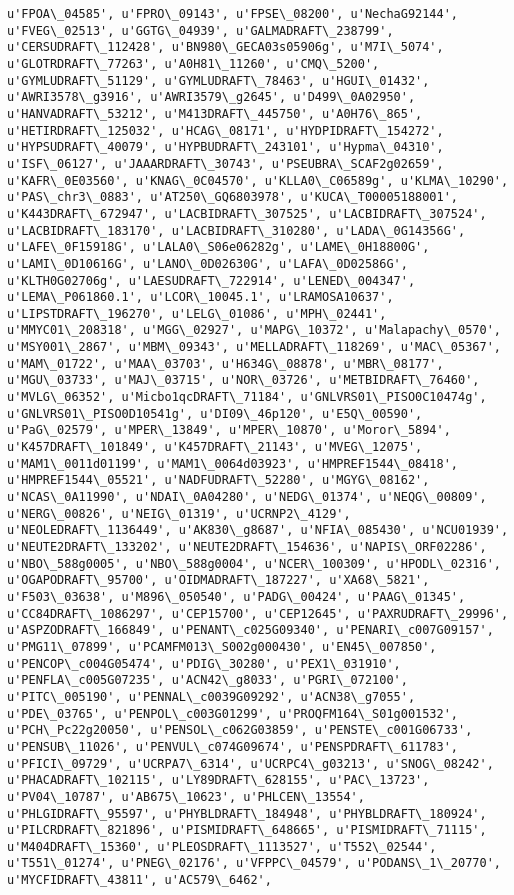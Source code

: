 \documentclass[11pt]{article}
\begin{document}
\begin{Verbatim}[commandchars=\\\{\}]
u'FPOA\_04585', u'FPRO\_09143', u'FPSE\_08200', u'NechaG92144', u'FVEG\_02513', u'GGTG\_04939', u'GALMADRAFT\_238799', u'CERSUDRAFT\_112428', u'BN980\_GECA03s05906g', u'M7I\_5074', u'GLOTRDRAFT\_77263', u'A0H81\_11260', u'CMQ\_5200', u'GYMLUDRAFT\_51129', u'GYMLUDRAFT\_78463', u'HGUI\_01432', u'AWRI3578\_g3916', u'AWRI3579\_g2645', u'D499\_0A02950', u'HANVADRAFT\_53212', u'M413DRAFT\_445750', u'A0H76\_865', u'HETIRDRAFT\_125032', u'HCAG\_08171', u'HYDPIDRAFT\_154272', u'HYPSUDRAFT\_40079', u'HYPBUDRAFT\_243101', u'Hypma\_04310', u'ISF\_06127', u'JAAARDRAFT\_30743', u'PSEUBRA\_SCAF2g02659', u'KAFR\_0E03560', u'KNAG\_0C04570', u'KLLA0\_C06589g', u'KLMA\_10290', u'PAS\_chr3\_0883', u'AT250\_GQ6803978', u'KUCA\_T00005188001', u'K443DRAFT\_672947', u'LACBIDRAFT\_307525', u'LACBIDRAFT\_307524', u'LACBIDRAFT\_183170', u'LACBIDRAFT\_310280', u'LADA\_0G14356G', u'LAFE\_0F15918G', u'LALA0\_S06e06282g', u'LAME\_0H18800G', u'LAMI\_0D10616G', u'LANO\_0D02630G', u'LAFA\_0D02586G', u'KLTH0G02706g', u'LAESUDRAFT\_722914', u'LENED\_004347', u'LEMA\_P061860.1', u'LCOR\_10045.1', u'LRAMOSA10637', u'LIPSTDRAFT\_196270', u'LELG\_01086', u'MPH\_02441', u'MMYC01\_208318', u'MGG\_02927', u'MAPG\_10372', u'Malapachy\_0570', u'MSY001\_2867', u'MBM\_09343', u'MELLADRAFT\_118269', u'MAC\_05367', u'MAM\_01722', u'MAA\_03703', u'H634G\_08878', u'MBR\_08177', u'MGU\_03733', u'MAJ\_03715', u'NOR\_03726', u'METBIDRAFT\_76460', u'MVLG\_06352', u'Micbo1qcDRAFT\_71184', u'GNLVRS01\_PISO0C10474g', u'GNLVRS01\_PISO0D10541g', u'DI09\_46p120', u'E5Q\_00590', u'PaG\_02579', u'MPER\_13849', u'MPER\_10870', u'Moror\_5894', u'K457DRAFT\_101849', u'K457DRAFT\_21143', u'MVEG\_12075', u'MAM1\_0011d01199', u'MAM1\_0064d03923', u'HMPREF1544\_08418', u'HMPREF1544\_05521', u'NADFUDRAFT\_52280', u'MGYG\_08162', u'NCAS\_0A11990', u'NDAI\_0A04280', u'NEDG\_01374', u'NEQG\_00809', u'NERG\_00826', u'NEIG\_01319', u'UCRNP2\_4129', u'NEOLEDRAFT\_1136449', u'AK830\_g8687', u'NFIA\_085430', u'NCU01939', u'NEUTE2DRAFT\_133202', u'NEUTE2DRAFT\_154636', u'NAPIS\_ORF02286', u'NBO\_588g0005', u'NBO\_588g0004', u'NCER\_100309', u'HPODL\_02316', u'OGAPODRAFT\_95700', u'OIDMADRAFT\_187227', u'XA68\_5821', u'F503\_03638', u'M896\_050540', u'PADG\_00424', u'PAAG\_01345', u'CC84DRAFT\_1086297', u'CEP15700', u'CEP12645', u'PAXRUDRAFT\_29996', u'ASPZODRAFT\_166849', u'PENANT\_c025G09340', u'PENARI\_c007G09157', u'PMG11\_07899', u'PCAMFM013\_S002g000430', u'EN45\_007850', u'PENCOP\_c004G05474', u'PDIG\_30280', u'PEX1\_031910', u'PENFLA\_c005G07235', u'ACN42\_g8033', u'PGRI\_072100', u'PITC\_005190', u'PENNAL\_c0039G09292', u'ACN38\_g7055', u'PDE\_03765', u'PENPOL\_c003G01299', u'PROQFM164\_S01g001532', u'PCH\_Pc22g20050', u'PENSOL\_c062G03859', u'PENSTE\_c001G06733', u'PENSUB\_11026', u'PENVUL\_c074G09674', u'PENSPDRAFT\_611783', u'PFICI\_09729', u'UCRPA7\_6314', u'UCRPC4\_g03213', u'SNOG\_08242', u'PHACADRAFT\_102115', u'LY89DRAFT\_628155', u'PAC\_13723', u'PV04\_10787', u'AB675\_10623', u'PHLCEN\_13554', u'PHLGIDRAFT\_95597', u'PHYBLDRAFT\_184948', u'PHYBLDRAFT\_180924', u'PILCRDRAFT\_821896', u'PISMIDRAFT\_648665', u'PISMIDRAFT\_71115', u'M404DRAFT\_15360', u'PLEOSDRAFT\_1113527', u'T552\_02544', u'T551\_01274', u'PNEG\_02176', u'VFPPC\_04579', u'PODANS\_1\_20770', u'MYCFIDRAFT\_43811', u'AC579\_6462', 
\end{Verbatim}
\end{document}
